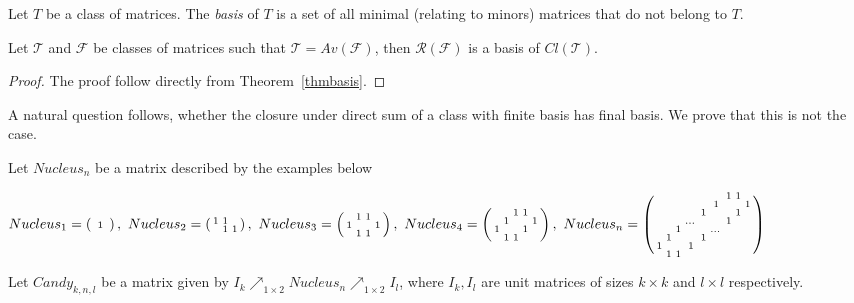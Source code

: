 \begin{defn}
Let $T$ be a class of matrices. The \emph{basis} of $T$ is a set of all minimal (relating to minors) matrices that do not belong to $T$.
\end{defn}
\begin{cor}
Let $\mathcal{T}$ and $\mathcal{F}$ be classes of matrices such that $\mathcal{T}=Av(\mathcal{F})$, then $\mathcal{R}(\mathcal{F})$ is a basis of $Cl(\mathcal{T})$.
\end{cor}
\begin{proof}
The proof follow directly from Theorem~\ref{thmbasis}.
\end{proof}
A natural question follows, whether the closure under direct sum of a class with finite basis has final basis. We prove that this is not the case.

\begin{defn}
Let $Nucleus_n$ be a matrix described by the examples below
\end{defn}
$Nucleus_1=\smm{ &1& },\ Nucleus_2=\smm{1&1& \\ &1&1},\ Nucleus_3=\smm{ &1&1& \\1& & &1\\ &1&1& },\ Nucleus_4=\smm{ & &1&1& \\ &1& & &1\\1& & &1& \\ &1&1& & },\ Nucleus_n=\smm{ & & & & & &1&1& \\ & & & & &1& & &1\\ & & & &1& & &1& \\ & & &\dots& & &1& & \\ & &1& & &\dots& & & \\ &1& & &1& & & & \\1& & &1& & & & & \\ &1&1& & & & & & \\}$
\begin{defn}
Let $Candy_{k,n,l}$ be a matrix given by $I_k\nearrow_{1\times2}Nucleus_n\nearrow_{1\times2}I_l$, where $I_k,I_l$ are unit matrices of sizes $k\times k$ and $l\times l$ respectively.
\end{defn}
